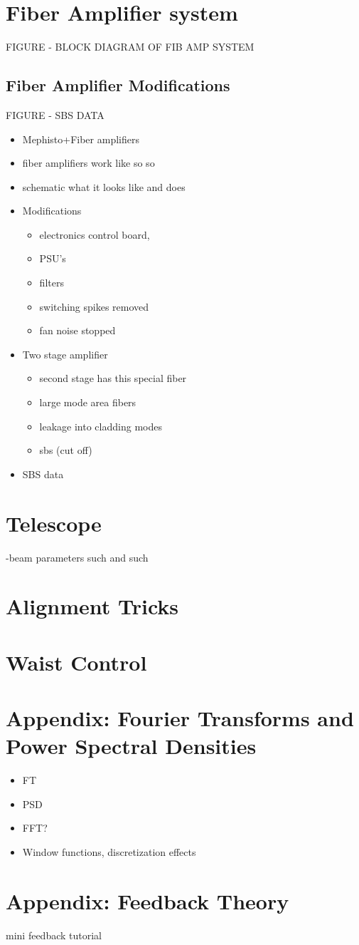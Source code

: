 \documentclass[twocolumn,aps,pra,showpacs,preprintnumbers,bibnotes]{revtex4-1}
\begin{document}
\section{Fiber Amplifier system}
FIGURE - BLOCK DIAGRAM OF FIB AMP SYSTEM

\subsection{Fiber Amplifier Modifications}
FIGURE - SBS DATA
\begin{itemize}
	\item Mephisto+Fiber amplifiers
\item fiber amplifiers work like so so
\item schematic what it looks like and does
\item Modifications
	\begin{itemize}
		\item electronics control board,
		\item PSU's
		\item filters
		\item switching spikes removed
		\item fan noise stopped
	\end{itemize}
\item Two stage amplifier
	\begin{itemize}
		\item second stage has this special fiber 
		\item large mode area fibers
		\item leakage into cladding modes 
		\item sbs (cut off)
	\end{itemize}
\item SBS data
\end{itemize}
\section{Telescope}
-beam parameters such and such

\section{Alignment Tricks}

\section{Waist Control}
\section{Appendix: Fourier Transforms and Power Spectral Densities}
\begin{itemize}
	\item FT
	\item PSD
	\item FFT? 
	\item Window functions, discretization effects
\end{itemize}
\section{Appendix: Feedback Theory}
mini feedback tutorial
\end{document}
